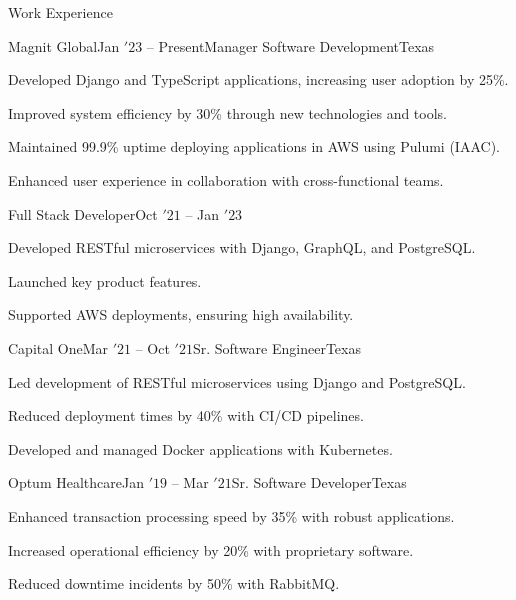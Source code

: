 \documentclass{resume} %
\begin{document}
\begin{rSection}{Work Experience}
\begin{rSubsection}{Magnit Global}{Jan \('23\) -- Present}{Manager Software Development}{Texas}
\item Developed Django and TypeScript applications, increasing user adoption by 25\%.
\item Improved system efficiency by 30\% through new technologies and tools.
\item Maintained 99.9\% uptime deploying applications in AWS using Pulumi (IAAC).
\item Enhanced user experience in collaboration with cross-functional teams.

\end{rSubsection}

\begin{rSubsectionSameComp}{Full Stack Developer}{Oct \('21\) -- Jan \('23\)}{}{}
\item Developed RESTful microservices with Django, GraphQL, and PostgreSQL.
\item Launched key product features.
\item Supported AWS deployments, ensuring high availability.
\end{rSubsectionSameComp}

\begin{rSubsection}{Capital One}{Mar \('21\) -- Oct \('21\)}{Sr. Software Engineer}{Texas}
\item Led development of RESTful microservices using Django and PostgreSQL.
\item Reduced deployment times by 40\% with CI/CD pipelines.
\item Developed and managed Docker applications with Kubernetes.
\end{rSubsection}

\begin{rSubsection}{Optum Healthcare}{Jan \('19\) -- Mar \('21\)}{Sr. Software Developer}{Texas}
\item Enhanced transaction processing speed by 35\% with robust applications.
\item Increased operational efficiency by 20\% with proprietary software.
\item Reduced downtime incidents by 50\% with RabbitMQ.
\end{rSubsection}


\end{rSection}
\end{document}

